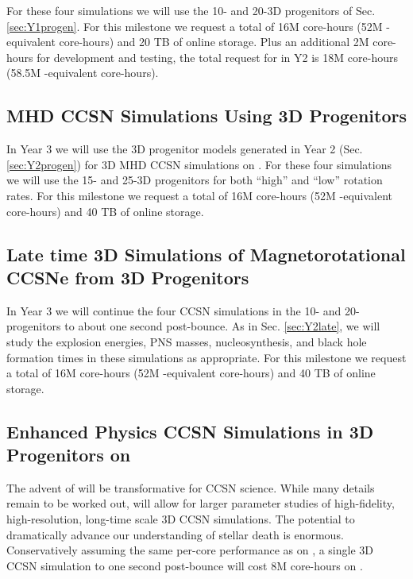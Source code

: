 For these four simulations we will use the 10- and 20-\msun 3D progenitors of Sec. \ref{sec:Y1progen}.
For this milestone we request a total of 16M \thet core-hours (52M \mira-equivalent core-hours) and 20 TB of online storage.
Plus an additional 2M \thet core-hours for development and testing, the total request for \thet in Y2 is 18M core-hours (58.5M \mira-equivalent core-hours).

\vspace{0.1in} 

\subsection{MHD CCSN Simulations Using 3D Progenitors}
\label{sec:Y3mrccsn}

In Year 3 we will use the 3D progenitor models generated in Year 2 (Sec. \ref{sec:Y2progen}) for 3D MHD CCSN simulations on \thet.
For these four simulations we will use the 15- and 25-\msun 3D progenitors for both ``high'' and ``low'' rotation rates.
For this milestone we request a total of 16M \thet core-hours (52M \mira-equivalent core-hours) and 40 TB of online storage.

\subsection{Late time 3D Simulations of Magnetorotational CCSNe from 3D Progenitors}
\label{sec:Y3late}

In Year 3 we will continue the four CCSN simulations in the 10- and 20-\msun progenitors to about one second post-bounce.
As in Sec. \ref{sec:Y2late}, we will study the explosion energies, PNS masses, nucleosynthesis, and black hole formation times in these simulations as appropriate.
For this milestone we request a total of 16M \thet core-hours (52M \mira-equivalent core-hours) and 40 TB of online storage.


\subsection{Enhanced Physics CCSN Simulations in 3D Progenitors on \aurora}
\label{sec:Y3aurora}

The advent of \aurora will be transformative for CCSN science.
While many details remain to be worked out, \aurora will allow for larger parameter studies of high-fidelity, high-resolution, long-time scale 3D CCSN simulations.
The potential to dramatically advance our understanding of stellar death is enormous.
Conservatively assuming the same per-core performance as on \thet, a single 3D CCSN simulation to one second post-bounce will cost 8M core-hours on \aurora.


